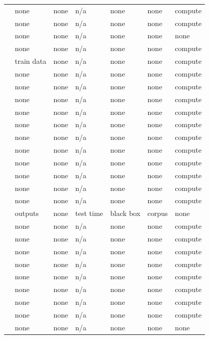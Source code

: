\begin{landscape}
\begin{longtable}{rllllll}
\cite{DHSS25} & none & none & n/a & none & none & compute \\
\cite{BSWRLW25} & none & none & n/a & none & none & compute \\
\cite{AQPWPWCR22} & none & none & n/a & none & none & none \\
\cite{DSWZ23} & none & none & n/a & none & none & compute \\
\cite{RV24} & train data & none & n/a & none & none & compute \\
\cite{BAP24} & none & none & n/a & none & none & compute \\
\cite{BDKLS24} & none & none & n/a & none & none & compute \\
\cite{BAP25} & none & none & n/a & none & none & compute \\
\cite{FGRVX17} & none & none & n/a & none & none & compute \\
\cite{DVV16} & none & none & n/a & none & none & compute \\
\cite{BIS17} & none & none & n/a & none & none & compute \\
\cite{AS24} & none & none & n/a & none & none & compute \\
\cite{ACMS23} & none & none & n/a & none & none & compute \\
\cite{BCS24} & none & none & n/a & none & none & compute \\
\cite{BC22} & none & none & n/a & none & none & compute \\
\cite{AHY25} & none & none & n/a & none & none & compute \\
\cite{SHMWGWS26} & outputs & none & test time & black box & corpus & none \\
\cite{KJWSM26} & none & none & n/a & none & none & compute \\
\cite{GJW22} & none & none & n/a & none & none & compute \\
\cite{GJW20} & none & none & n/a & none & none & compute \\
\cite{DPLB24} & none & none & n/a & none & none & compute \\
\cite{DLB25} & none & none & n/a & none & none & compute \\
\cite{LZZ25} & none & none & n/a & none & none & compute \\
\cite{SZB21} & none & none & n/a & none & none & compute \\
\cite{BEGKMZ22} & none & none & n/a & none & none & compute \\
\cite{HS24} & none & none & n/a & none & none & none \\

\end{longtable}
\end{landscape}
